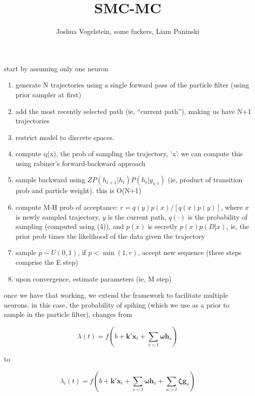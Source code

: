 \documentclass[12pt]{article}
\title{SMC-MC}
\author{Joshua Vogelstein, some fuckers,  Liam Paninski}
\providecommand{\ve}[1]{\boldsymbol{#1}}
\providecommand{\ve}[1]{\boldsymbol{#1}}
\begin{document}
\maketitle

%
%

start by assuming only one neuron


\begin{enumerate}
\item generate N trajectories using a single forward pass of the particle filter (using prior sampler at first)
\item add the most recently selected path (ie, ``current path''), making us have N+1 trajectories
\item restrict model to discrete spaces. 
\item compute q(x), the prob of sampling the trajectory, 'x'.  we can compute this using rabiner's forward-backward approach
\item sample backward using $Z  P(h_{t+1} | h_t) P(h_t | y_{1:t})$ (ie, product of transition prob and particle weight).  this is O(N+1)
\item compute M-H prob of acceptance: $r=q(y) p(x) / [q(x) p(y)]$, where $x$ is newly sampled trajectory, $y$ is the current path, $q(\cdot)$ is the probability of sampling (computed using (4)), and $p(x)$ is secretly $p(x)p(D|x)$, ie, the prior prob times the likelihood of the data given the trajectory
\item sample $p \sim U(0,1)$, if $p< \min(1,r)$, accept new sequence (these steps comprise the E step)
\item upon convergence, estimate parameters (ie, M step)
\end{enumerate}

once we have that working, we extend the framework to facilitate multiple neurons.  in this case, the probability of spiking (which we use as a prior to sample in the particle filter), changes from  

\begin{equation}
\lambda(t) = f(b+ \ve{k}' \ve{x}_t + \sum_{s<t} \ve{\omega} \ve{h}_s)
\end{equation}

to

\begin{equation}
\lambda_i(t) = f(b + \ve{k}' \ve{x}_t + \sum_{s<t} \ve{\omega} \ve{h}_s + \sum_{u>t} \ve{\zeta} \ve{g}_u)
\end{equation}
\end{document}
